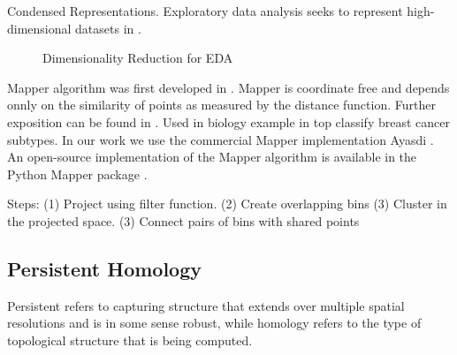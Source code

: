 Condensed Representations.
Exploratory data analysis seeks to represent high-dimensional datasets in .

\begin{figure}
\caption[Dimensionality Reduction for EDA]{Dimensionality Reduction for EDA}
\label{background:fig:eda}
\end{figure}

Mapper algorithm was first developed in \cite{Singh:2007ve}.
Mapper is coordinate free and depends onnly on the similarity of points as measured by the distance function.
Further exposition can be found in \cite{Lum:2013cz}.
Used in biology example in \cite{Nicolau:2011} top classify breast cancer subtypes.
In our work we use the commercial Mapper implementation Ayasdi \cite{AyasdiIris:2015}.
An open-source implementation of the Mapper algorithm is available in the Python Mapper package \cite{Mullner:2013}.

Steps:
(1) Project using filter function.
(2) Create overlapping bins
(3) Cluster in the projected space.
(3) Connect pairs of bins with shared points

\subsection{Persistent Homology}
\label{background:ss:persistent_homology}

Persistent refers to capturing structure that extends over multiple spatial resolutions and is in some sense robust, while homology refers to the type of topological structure that is being computed.

